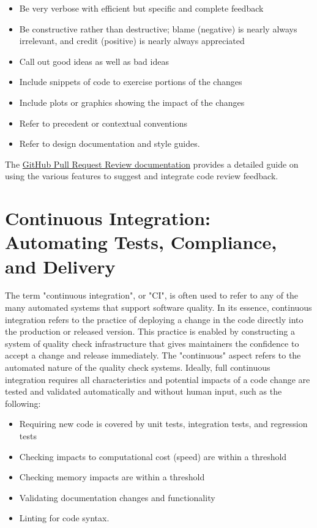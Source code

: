 \documentclass[]{nrel}
\begin{document}
\begin{itemize}
\item Be very verbose with efficient but specific and complete feedback
\item Be constructive rather than destructive; blame (negative) is nearly always irrelevant,
    and credit (positive) is nearly always appreciated
\item Call out good ideas as well as bad ideas
\item Include snippets of code to exercise portions of the changes
\item Include plots or graphics showing the impact of the changes
\item Refer to precedent or contextual conventions
\item Refer to design documentation and style guides.
\end{itemize}

The \href{https://docs.github.com/en/pull-requests/collaborating-with-pull-requests/reviewing-changes-in-pull-requests/incorporating-feedback-in-your-pull-request}{GitHub Pull Request Review documentation}
provides a detailed guide on using the various features to suggest and integrate
code review feedback.


\section{Continuous Integration: Automating Tests, Compliance, and Delivery}
\label{sec:continuous}

The term "continuous integration", or "CI", is often used to refer to any of the many
automated systems that support software quality.
In its essence, continuous integration refers to the practice of deploying a change in
the code directly into the production or released version.
This practice is enabled by constructing a system of quality check infrastructure that gives
maintainers the confidence to accept a change and release immediately.
The "continuous" aspect refers to the automated nature of the quality check systems.
Ideally, full continuous integration requires all characteristics and potential
impacts of a code change are tested and validated automatically and without human
input, such as the following:
\begin{itemize}
\item Requiring new code is covered by unit tests, integration tests, and regression tests
\item Checking impacts to computational cost (speed) are within a threshold
\item Checking memory impacts are within a threshold
\item Validating documentation changes and functionality
\item Linting for code syntax.
\end{itemize}
\end{document}
